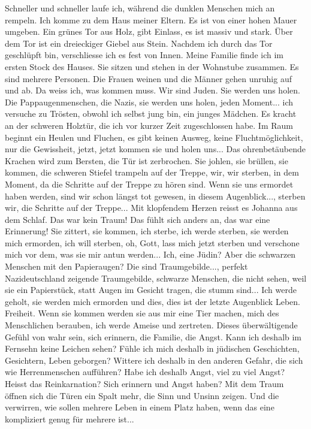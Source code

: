 Schneller und schneller laufe ich, während die dunklen Menschen mich an rempeln. Ich komme zu dem Haus meiner Eltern. Es ist von einer hohen Mauer umgeben. Ein grünes Tor aus Holz, gibt Einlass, es ist massiv und stark. Über dem Tor ist ein dreieckiger Giebel aus Stein. 
Nachdem ich durch das Tor geschlüpft bin, verschliesse ich es fest von Innen. 
Meine Familie finde ich im ersten Stock des Hauses. Sie sitzen und stehen in der Wohnstube zusammen. Es sind mehrere Personen. Die Frauen weinen und die Männer gehen unruhig auf und ab. Da weiss ich, was kommen muss. Wir sind Juden. Sie werden uns holen. Die Pappaugenmenschen, die Nazis, sie werden uns holen, jeden Moment... ich versuche zu Trösten, obwohl ich selbst jung bin, ein junges Mädchen.
Es kracht an der schweren Holztür, die ich vor kurzer Zeit zugeschlossen habe. Im Raum beginnt ein Heulen und Fluchen, es gibt keinen Ausweg, keine Fluchtmöglichkeit, nur die Gewissheit, jetzt, jetzt kommen sie und holen uns...
Das ohrenbetäubende Krachen wird zum Bersten, die Tür ist zerbrochen. Sie johlen, sie brüllen, sie kommen, die schweren Stiefel trampeln auf der Treppe, wir, wir sterben, in dem Moment, da die Schritte auf der Treppe zu hören sind. Wenn sie uns ermordet haben werden, sind wir schon längst tot gewesen, in diesem Augenblick..., sterben wir, die Schritte auf der Treppe...
Mit klopfendem Herzen reisst es Johanna aus dem Schlaf. Das war kein Traum! Das fühlt sich anders an, das war eine Erinnerung! Sie zittert, sie kommen, ich sterbe, ich werde sterben, sie werden mich ermorden, ich will sterben, oh, Gott, lass mich jetzt sterben und verschone mich vor dem, was sie mir antun werden...
Ich, eine Jüdin? Aber die schwarzen Menschen mit den Papieraugen? Die sind Traumgebilde..., perfekt Nazideutschland zeigende Traumgebilde, schwarze Menschen, die nicht sehen, weil sie ein Papierstück, statt Augen im Gesicht tragen, die stumm sind...
Ich werde geholt, sie werden mich ermorden und dies, dies ist der letzte Augenblick Leben. Freiheit. Wenn sie kommen werden sie aus mir eine Tier machen, mich des Menschlichen berauben, ich werde Ameise und zertreten.
Dieses überwältigende Gefühl von wahr sein, sich erinnern, die Familie, die Angst.
Kann ich deshalb im Fernsehn keine Leichen sehen? Fühle ich mich deshalb in jüdischen Geschichten, Gesichtern, Leben geborgen?  Wittere ich deshalb in den anderen Gefahr, die sich wie Herrenmenschen aufführen? Habe ich deshalb Angst, viel zu viel Angst? 
Heisst das Reinkarnation? Sich erinnern und Angst haben?
Mit dem Traum öffnen sich die Türen ein Spalt mehr, die Sinn und Unsinn zeigen. Und die verwirren, wie sollen mehrere Leben in einem Platz haben, wenn das eine kompliziert genug für mehrere ist...
